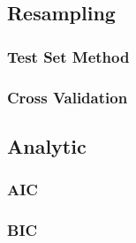 \subsection{Resampling}
\subsubsection{Test Set Method}
\subsubsection{Cross Validation}
\subsection{Analytic}
\subsubsection{AIC}
\subsubsection{BIC}
